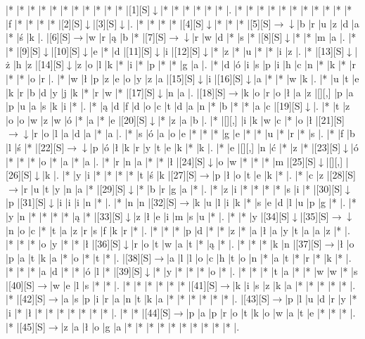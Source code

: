 \documentclass[11pt]{article}
\newcommand\drarr{$\rightarrow \!\!\!\!\! \downarrow$}
\newcommand\rarr{$\rightarrow$}
\newcommand\darr{$\downarrow$}
\begin{document}
\noindent\begin{Puzzle}{17}{33}|*	|*	|*	|*	|*	|*	|*	|*	|*	|*	|*	|[1][S]\darr	|*	|*	|*	|*	|*	|*	|.
|*	|*	|*	|*	|*	|*	|*	|*	|*	|*	|*	|f	|*	|*	|*	|*	|[2][S]\darr	|[3][S]\darr	|.
|*	|*	|*	|*	|[4][S]\darr	|*	|*	|*	|[5][S]\drarr	|b	|r	|u	|z	|d	|a	|*	|ś	|k	|.
|[6][S]\rarr	|w	|r	|ą	|b	|*	|[7][S]\drarr	|r	|w	|d	|*	|s	|*	|[8][S]\darr	|*	|*	|m	|a	|.
|*	|*	|[9][S]\darr	|[10][S]\darr	|e	|*	|d	|[11][S]\darr	|i	|[12][S]\darr	|*	|z	|*	|u	|*	|*	|i	|z	|.
|*	|[13][S]\darr	|ż	|h	|z	|[14][S]\darr	|z	|o	|l	|k	|*	|i	|*	|p	|*	|*	|g	|a	|.
|*	|d	|ó	|i	|s	|p	|i	|h	|c	|n	|*	|k	|*	|r	|*	|*	|o	|r	|.
|*	|w	|ł	|p	|z	|e	|o	|y	|z	|a	|[15][S]\darr	|i	|[16][S]\darr	|a	|*	|*	|w	|k	|.
|*	|u	|t	|e	|k	|r	|b	|d	|y	|j	|k	|*	|r	|w	|*	|[17][S]\darr	|n	|a	|.
|[18][S]\rarr	|k	|o	|r	|o	|ł	|a	|z	|[][,]{ }	|p	|a	|p	|u	|a	|s	|k	|i	|*	|.
|*	|ą	|d	|f	|d	|o	|c	|t	|d	|a	|n	|*	|b	|*	|*	|a	|c	|[19][S]\darr	|.
|*	|t	|z	|o	|o	|w	|z	|w	|ó	|*	|a	|*	|e	|[20][S]\darr	|*	|z	|a	|b	|.
|*	|[][,]{ }	|i	|k	|w	|c	|*	|o	|ł	|[21][S]\drarr	|r	|o	|l	|a	|d	|a	|*	|a	|.
|*	|s	|ó	|a	|o	|e	|*	|*	|*	|g	|e	|*	|*	|u	|*	|r	|*	|s	|.
|*	|f	|b	|l	|ś	|*	|[22][S]\drarr	|p	|ó	|ł	|k	|r	|y	|t	|e	|k	|*	|k	|.
|*	|e	|[][,]{ }	|n	|ć	|*	|z	|*	|[23][S]\darr	|ó	|*	|*	|*	|o	|*	|a	|*	|a	|.
|*	|r	|n	|a	|*	|*	|ł	|[24][S]\darr	|o	|w	|*	|*	|*	|m	|[25][S]\darr	|[][,]{ }	|[26][S]\darr	|k	|.
|*	|y	|i	|*	|*	|*	|*	|t	|ś	|k	|[27][S]\rarr	|p	|ł	|o	|t	|e	|k	|*	|.
|*	|c	|z	|[28][S]\rarr	|r	|u	|t	|y	|n	|a	|*	|[29][S]\darr	|*	|b	|r	|g	|a	|*	|.
|*	|z	|i	|*	|*	|*	|*	|s	|i	|*	|[30][S]\darr	|p	|[31][S]\darr	|i	|i	|i	|n	|*	|.
|*	|n	|n	|[32][S]\rarr	|k	|u	|l	|i	|k	|*	|s	|e	|d	|l	|u	|p	|g	|*	|.
|*	|y	|n	|*	|*	|*	|*	|ą	|*	|[33][S]\darr	|z	|ł	|e	|i	|m	|s	|u	|*	|.
|*	|*	|y	|[34][S]\darr	|[35][S]\drarr	|n	|o	|c	|*	|t	|a	|z	|r	|s	|f	|k	|r	|*	|.
|*	|*	|*	|p	|d	|*	|*	|z	|*	|a	|ł	|a	|y	|t	|a	|a	|z	|*	|.
|*	|*	|*	|o	|y	|*	|*	|ł	|[36][S]\darr	|r	|o	|t	|w	|a	|t	|*	|ą	|*	|.
|*	|*	|*	|k	|n	|[37][S]\rarr	|ł	|o	|p	|a	|t	|k	|a	|*	|o	|*	|t	|*	|.
|[38][S]\rarr	|a	|l	|l	|o	|c	|h	|t	|o	|n	|*	|a	|t	|*	|r	|*	|k	|*	|.
|*	|*	|*	|a	|d	|*	|*	|ó	|l	|*	|[39][S]\darr	|*	|y	|*	|*	|*	|o	|*	|.
|*	|*	|*	|t	|a	|*	|*	|w	|w	|*	|s	|[40][S]\rarr	|w	|e	|l	|s	|*	|*	|.
|*	|*	|*	|*	|*	|*	|[41][S]\rarr	|k	|i	|s	|z	|k	|a	|*	|*	|*	|*	|*	|.
|*	|[42][S]\rarr	|a	|s	|p	|i	|r	|a	|n	|t	|k	|a	|*	|*	|*	|*	|*	|*	|.
|[43][S]\rarr	|p	|l	|u	|d	|r	|y	|*	|i	|*	|ł	|*	|*	|*	|*	|*	|*	|*	|.
|*	|*	|[44][S]\rarr	|p	|a	|p	|r	|o	|t	|k	|o	|w	|a	|t	|e	|*	|*	|*	|.
|*	|[45][S]\rarr	|z	|a	|ł	|o	|g	|a	|*	|*	|*	|*	|*	|*	|*	|*	|*	|*	|.\end{Puzzle}
\end{document}
